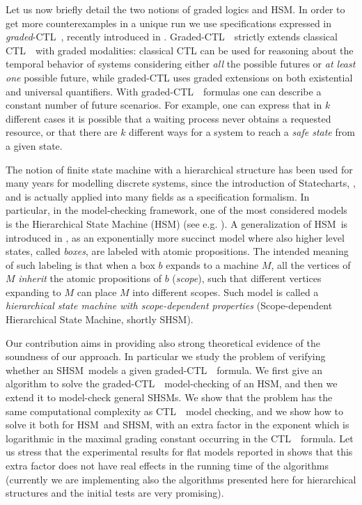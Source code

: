\documentclass[letterpaper,twocolumn,10pt]{article}
\def    \ctl        {\mbox{\textsc{CTL }\xspace}}
\def    \CTL        {\mbox{\textsc{CTL }\xspace}}
\newcommand{\VHSM}{SHSM}
\newcommand{\HSM}{HSM}
\begin{document}
Let us now briefly detail the two notions of graded logics and HSM.
In order to get more counterexamples in a unique run we use
specifications expressed in {\em graded}-\CTL, recently introduced in \cite{FNP08}.
Graded-\CTL\ strictly extends classical \CTL\ with graded modalities: classical CTL can be used for reasoning
about the temporal behavior of systems con\-si\-de\-ring either {\em all} the possible futures
or {\em at least one} possible future, while graded-CTL uses graded extensions on
both exi\-stential and universal quantifiers.
With graded-\CTL\ formulas one can describe a constant number of future scenarios. For example,
one can express that in $k$ different cases it is possible that a waiting process never
obtains a requested resource, or that there are $k$ different ways for a system to reach a
{\em safe state} from a given state.

The notion of finite state machine with a hierarchical structure
has been used for many years for modelling discrete systems,
since the introduction of Statecharts, \cite{H87}, and is actually
applied into many fields as a specification formalism.
In particular, in the  model-checking framework, one of the most considered models is the Hierarchical State Machine (\HSM)
 (see e.g. \cite{AY01}).
A generalization of \HSM\ is introduced
in \cite{LNPP08}, as an exponentially more succinct model  where also higher level states, called {\em boxes},  are labeled with atomic propositions.
The intended meaning of such labeling is that when a box $b$
expands to a machine $M$, all the vertices of $M$ \emph{inherit} the
atomic propositions of $b$ (\emph{scope}), such that different
vertices expanding to $M$ can place $M$ into different scopes.
Such model is called a \emph{hierarchical state machine
with scope-dependent properties} (Scope-dependent Hierarchical State Machine, shortly \VHSM).


Our contribution aims in providing also strong theoretical evidence of
the soundness of our approach.
In particular we study the problem of verifying whether an \VHSM\ models a given graded-\ctl\ formula.
We first give an algorithm to solve the graded-\ctl\ model-checking  of an \HSM, and then
we extend it to model-check general \VHSM s.
We show that the problem has the same computational complexity as
 \ctl\ model checking, and we show how to solve it both for  \HSM\ and  \VHSM, with an extra factor in the exponent which is
logarithmic in the maximal grading constant occurring in the \CTL\ formula.
Let us stress that the experimental results for flat models reported in \cite{FMNPS10} shows that
 this  extra factor does not have real effects in the running time of the algorithms
(currently we are implementing also the algorithms presented here for
hierarchical structures and the initial tests are very promising).
\end{document}
